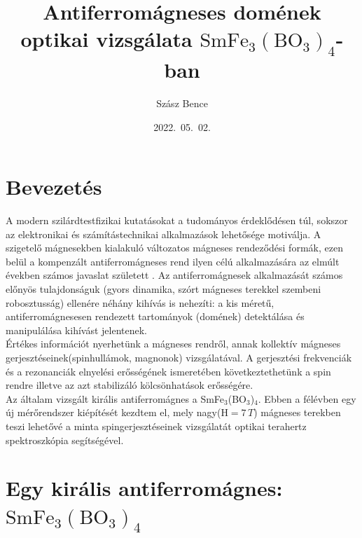 \documentclass[a4paper,12pt]{article}
\title{\bf Antiferromágneses domének optikai vizsgálata $\bm{\mathrm{SmFe_3(BO_3)_4}}$-ban}
\author{
 {Szász Bence } }
\date{2022.\ 05.\ 02.}
\newcommand\blankpage{%
    \null
    \thispagestyle{empty}%
    \addtocounter{page}{-1}%
    \newpage}
\numberwithin{equation}{section}
\begin{document}
\afterpage{\blankpage}






\tableofcontents
\newpage




\section{Bevezetés}
A modern szilárdtestfizikai kutatásokat a tudományos érdeklődésen túl, sokszor az elektronikai és számítástechnikai alkalmazások lehetősége motiválja. A szigetelő mágnesekben kialakuló változatos mágneses rendeződési formák, ezen belül a kompenzált antiferromágneses rend ilyen célú alkalmazására az elmúlt években számos javaslat született \cite{Jungwirth2016, Němec2018}. Az antiferromágnesek alkalmazását számos előnyös tulajdonságuk (gyors dinamika, szórt mágneses terekkel szembeni robosztusság) ellenére néhány kihívás is nehezíti: a kis méretű, antiferromágnesesen rendezett tartományok (domének) detektálása és manipulálása kihívást jelentenek.\\
Értékes információt nyerhetünk a mágneses rendről, annak kollektív mágneses gerjesztéseinek(spinhullámok, magnonok) vizsgálatával. A gerjesztési frekvenciák és a rezonanciák elnyelési erősségének ismeretében következtethetünk a spin rendre illetve az azt stabilizáló kölcsönhatások erősségére.\\
Az általam vizsgált királis antiferromágnes a SmFe$_3$(BO$_3$)$_4$. Ebben a félévben egy új mérőrendszer kiépítését kezdtem el, mely nagy($ \mathrm{H} =  7\,T$) mágneses terekben teszi lehetővé a minta spingerjesztéseinek vizsgálatát optikai terahertz spektroszkópia segítségével.








\newpage

\section{Egy királis antiferromágnes: \texorpdfstring{$\bm{\mathrm{SmFe_3(BO_3)_4}}$}{TEXT}  }
\end{document}

